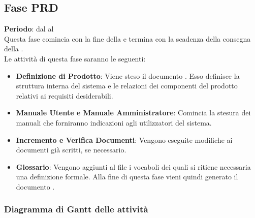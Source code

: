 \subsection{Fase PRD}
	\textbf{Periodo}: dal  al  \\Questa fase comincia con la fine della  e termina con la scadenza della consegna della .\\Le attività di questa fase saranno le seguenti:
	\begin{itemize}
		\item\textbf{Definizione di Prodotto}: Viene steso il documento . Esso definisce la struttura interna del sistema e le relazioni dei componenti del prodotto relativi ai requisiti desiderabili.
		\item\textbf{Manuale Utente e Manuale Amministratore}: Comincia la stesura dei manuali che forniranno indicazioni agli utilizzatori del sistema.
		\item\textbf{Incremento e Verifica Documenti}: Vengono eseguite modifiche ai documenti già scritti, se necessario.
		\item\textbf{Glossario}: Vengono aggiunti al file  i vocaboli dei quali si ritiene necessaria una definizione formale. Alla fine di questa fase vieni quindi generato il documento .
	\end{itemize}
	\subsubsection{Diagramma di Gantt delle attività}
